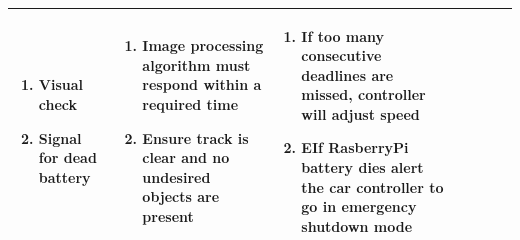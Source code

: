 \documentclass [10pt]{article}
\begin{document}
{\begin{minipage}{\textwidth}
\begin{longtable}{ |p{ }  | p{ } |  p{ } |  p{ } | p{ } | p{ } |  p{ }|}
\begin{minipage}{.18\textwidth}
                \begin{enumerate}
                    \item Visual check
                    \item Signal for dead battery \vspace {1mm}
                \end{enumerate}
        \end{minipage}
    & \begin{minipage}{.22\columnwidth} 
                \vspace{2mm}
                \begin{enumerate}
                    \item Image processing algorithm must respond within a required time
                    \item Ensure track is clear and no undesired objects are present\vspace {1mm}
                \end{enumerate}
        \end{minipage}
    
    
    & \begin{minipage}{.24 \columnwidth} 
                \vspace{2mm}
                \begin{enumerate}
                    \item If too many consecutive deadlines are missed, controller will adjust speed
                    \item EIf RasberryPi battery dies alert the car controller to go in emergency shutdown mode\vspace {1mm}
                \end{enumerate}
        \end{minipage} \\ \hline
    
   
    
    
    

\end{longtable}
\end{minipage}}
\end{document}
